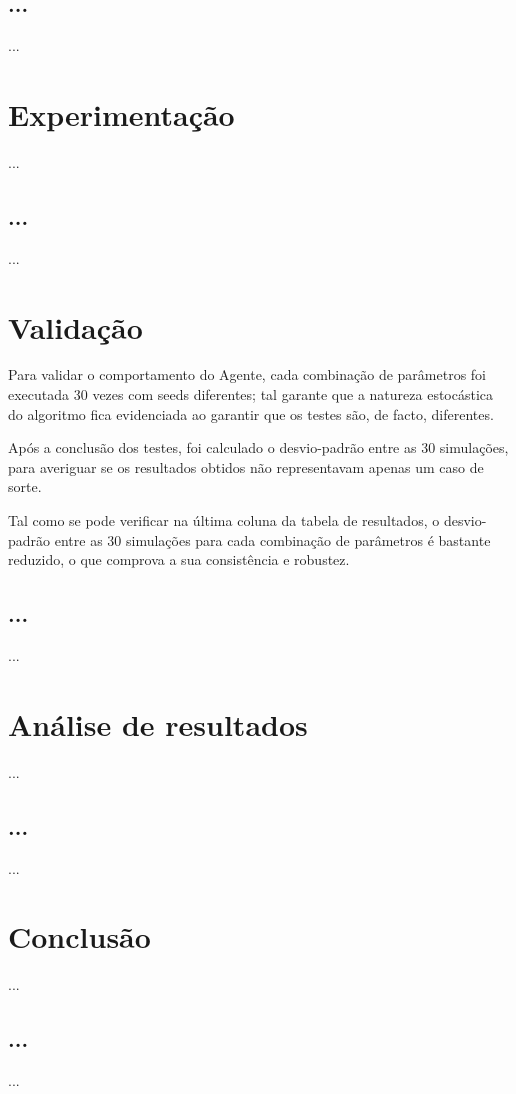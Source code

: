 \documentclass[a4paper]{article}
\begin{document}
\subsection{...}
\indent \indent ...

\cleardoublepage
\section{Experimentação}
\indent \indent ...

\cleardoublepage

\subsection{...}
\indent \indent ...

\cleardoublepage
\section{Validação}
\indent \indent Para validar o comportamento do Agente, cada combinação de parâmetros foi executada 30 vezes com seeds diferentes;
tal garante que a natureza estocástica do algoritmo fica evidenciada ao garantir que os testes são, de facto, diferentes.

Após a conclusão dos testes, foi calculado o desvio-padrão entre as 30 simulações,
para averiguar se os resultados obtidos não representavam apenas um caso de sorte.

Tal como se pode verificar na última coluna da tabela de resultados, o desvio-padrão entre as 30 simulações para cada combinação de parâmetros
é bastante reduzido, o que comprova a sua consistência e robustez.

\cleardoublepage

\subsection{...}
\indent \indent ...

\cleardoublepage
\section{Análise de resultados}
\indent \indent ...

\cleardoublepage

\subsection{...}
\indent \indent ...

\cleardoublepage
\section{Conclusão}
\indent \indent ...

\cleardoublepage

\subsection{...}
\indent \indent ...
\end{document}
